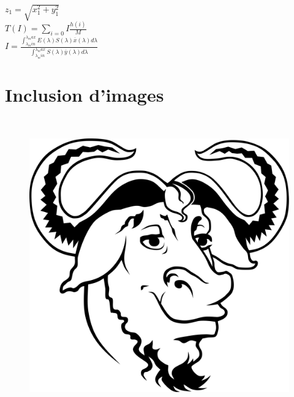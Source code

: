 \documentclass{article}
\begin{document}
$z_1 = \sqrt{x_1^2 + y_1^2}$\\

$T(I) = \sum_{i=0}{I}\frac{h(i)}{M}$\\
$I = \frac{\int_{\lambda_min} ^ {\lambda_max}E(\lambda)S(\lambda)\overline{x}(\lambda)d\lambda}{\int_{\lambda_min}^{\lambda_max}S(\lambda)\overline{y}(\lambda)d\lambda}$\\
\section{Inclusion d'images}\\

\begin{figure}

\includegraphics[width=14cm]{2000px-Heckert_GNU_white.png}\\

\end{figure}
\end{document}
